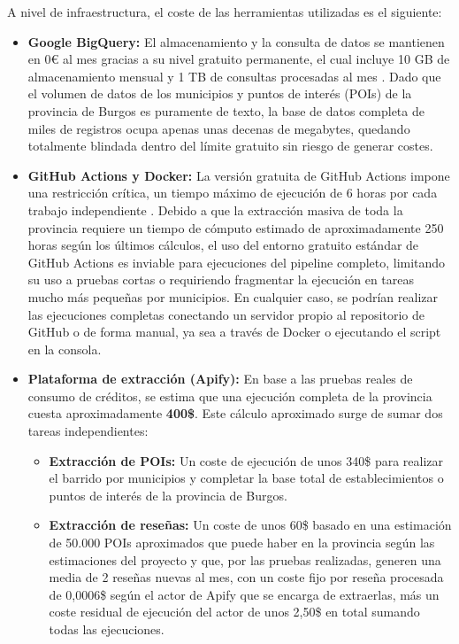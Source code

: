 A nivel de infraestructura, el coste de las herramientas utilizadas es el siguiente:
\begin{itemize}
    \item \textbf{Google BigQuery:} El almacenamiento y la consulta de datos se mantienen en 0€ al mes gracias a su nivel gratuito permanente, el cual incluye 10 GB de almacenamiento mensual y 1 TB de consultas procesadas al mes \cite{gcp_pricing_bigquery}. Dado que el volumen de datos de los municipios y puntos de interés (POIs) de la provincia de Burgos es puramente de texto, la base de datos completa de miles de registros ocupa apenas unas decenas de megabytes, quedando totalmente blindada dentro del límite gratuito sin riesgo de generar costes.
    \item \textbf{GitHub Actions y Docker:} La versión gratuita de GitHub Actions impone una restricción crítica, un tiempo máximo de ejecución de 6 horas por cada trabajo independiente \cite{github_actions_billing}. Debido a que la extracción masiva de toda la provincia requiere un tiempo de cómputo estimado de aproximadamente 250 horas según los últimos cálculos, el uso del entorno gratuito estándar de GitHub Actions es inviable para ejecuciones del pipeline completo, limitando su uso a pruebas cortas o requiriendo fragmentar la ejecución en tareas mucho más pequeñas por municipios. En cualquier caso, se podrían realizar las ejecuciones completas conectando un servidor propio al repositorio de GitHub o de forma manual, ya sea a través de Docker o ejecutando el script en la consola.
    \item \textbf{Plataforma de extracción (Apify):} En base a las pruebas reales de consumo de créditos, se estima que una ejecución completa de la provincia cuesta aproximadamente \textbf{400\$}. Este cálculo aproximado surge de sumar dos tareas independientes:
    \begin{itemize}
        \item \textbf{Extracción de POIs:} Un coste de ejecución de unos 340\$ para realizar el barrido por municipios y completar la base total de establecimientos o puntos de interés de la provincia de Burgos.
        \item \textbf{Extracción de reseñas:} Un coste de unos 60\$ basado en una estimación de 50.000 POIs aproximados que puede haber en la provincia según las estimaciones del proyecto y que, por las pruebas realizadas, generen una media de 2 reseñas nuevas al mes, con un coste fijo por reseña procesada de 0,0006\$ según el actor de Apify que se encarga de extraerlas, más un coste residual de ejecución del actor de unos 2,50\$ en total sumando todas las ejecuciones.
    \end{itemize}
\end{itemize}

